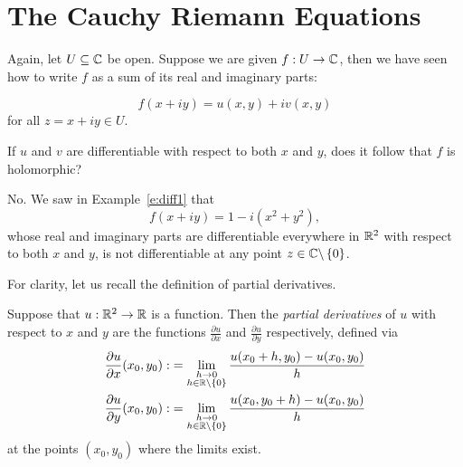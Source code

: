 \section{The Cauchy Riemann Equations}
Again, let $U \subseteq \mathbb{C}$ be open.  Suppose we are given $f:U \to \mathbb{C}$, then we have seen how to write $f$ as a sum of its real and imaginary parts:


\[ f(x+iy)=u(x,y)+iv(x,y) \]
for all $z=x+iy \in U$.  \

\begin{comment}
Written in terms of $z$, we have
\[
f(z) = \underbrace{\frac{f(z)+\conj{f(z)}}{2}}_{\text{Real}} + i \underbrace{\left(\frac{f(z)-\conj{f(z)}}{2i} \right)}_{\text{Real}}
\]
\end{comment}


\begin{question}
If $u$ and $v$ are differentiable with respect to both $x$ and $y$, does it follow that $f$ is holomorphic?  
\end{question}

\begin{answer}
No.  We saw in Example~\ref{e:diff1} that
\[
f(x+iy) = 1-i (x^2+y^2),
\]
whose real and imaginary parts are differentiable everywhere in $\mathbb{R}^2$ with respect to both $x$ and $y$, is not differentiable at any point $z \in \mathbb{C} \backslash \left\{0\right\}$.
\end{answer}

For clarity, let us recall the definition of partial derivatives.



\begin{definition}
Suppose that $u: \mathbb{R}^2 \to \mathbb{R}$ is a function.  Then the \emph{partial derivatives} of $u$ with respect to $x$ and $y$ are the functions $\frac{\partial u}{\partial x}$ and $\frac{\partial u}{\partial y}$ respectively, defined via
\begin{align*}
\frac{\partial u}{\partial x} (x_0,y_0):&= \lim_{\substack{h\to 0\\h \in \mathbb{R} \backslash \left\{0\right\}}} \frac{u(x_0+h,y_0)-u(x_0,y_0)}{h}\\
\frac{\partial u}{\partial y} (x_0,y_0):&= \lim_{\substack{h\to 0\\h \in \mathbb{R} \backslash \left\{0\right\}}} \frac{u(x_0,y_0+h)-u(x_0,y_0)}{h}
\end{align*}
at the points $(x_0,y_0)$ where the limits exist.
\end{definition}



